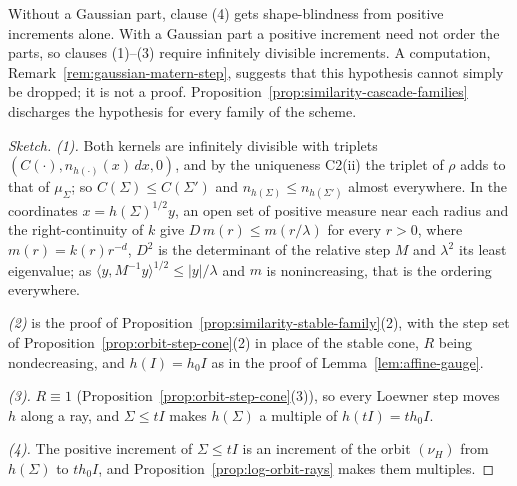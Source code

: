 Without a Gaussian part, clause (4) gets shape-blindness from positive increments alone. With a
Gaussian part a positive increment need not order the parts, so clauses (1)--(3) require infinitely
divisible increments. A computation, Remark~\ref{rem:gaussian-matern-step}, suggests that this
hypothesis cannot simply be dropped; it is not a proof. Proposition~\ref{prop:similarity-cascade-families}
discharges the hypothesis for every family of the scheme.

\begin{proof}[Sketch]
\emph{(1).} Both kernels are infinitely divisible with triplets $(C(\cdot), n_{h(\cdot)}(x)\,dx, 0)$, and
by the uniqueness C2(ii) the triplet of $\rho$ adds to that of $\mu_\Sigma$; so $C(\Sigma) \le C(\Sigma')$
and $n_{h(\Sigma)} \le n_{h(\Sigma')}$ almost everywhere. In the coordinates $x = h(\Sigma)^{1/2}y$, an
open set of positive measure near each radius and the right-continuity of $k$ give
$D\,m(r) \le m(r/\lambda)$ for every $r > 0$, where $m(r) = k(r)r^{-d}$, $D^2$ is the determinant of the
relative step $M$ and $\lambda^2$ its least eigenvalue; as $\langle y, M^{-1}y\rangle^{1/2} \le |y|/\lambda$
and $m$ is nonincreasing, that is the ordering everywhere.

\emph{(2)} is the proof of Proposition~\ref{prop:similarity-stable-family}(2), with the step set of
Proposition~\ref{prop:orbit-step-cone}(2) in place of the stable cone, $R$ being nondecreasing, and
$h(I) = h_0I$ as in the proof of Lemma~\ref{lem:affine-gauge}.

\emph{(3).} $R \equiv 1$ (Proposition~\ref{prop:orbit-step-cone}(3)), so every Loewner step moves $h$ along
a ray, and $\Sigma \le tI$ makes $h(\Sigma)$ a multiple of $h(tI) = th_0I$.

\emph{(4).} The positive increment of $\Sigma \le tI$ is an increment of the orbit $(\nu_H)$ from $h(\Sigma)$
to $th_0I$, and Proposition~\ref{prop:log-orbit-rays} makes them multiples.
\end{proof}

